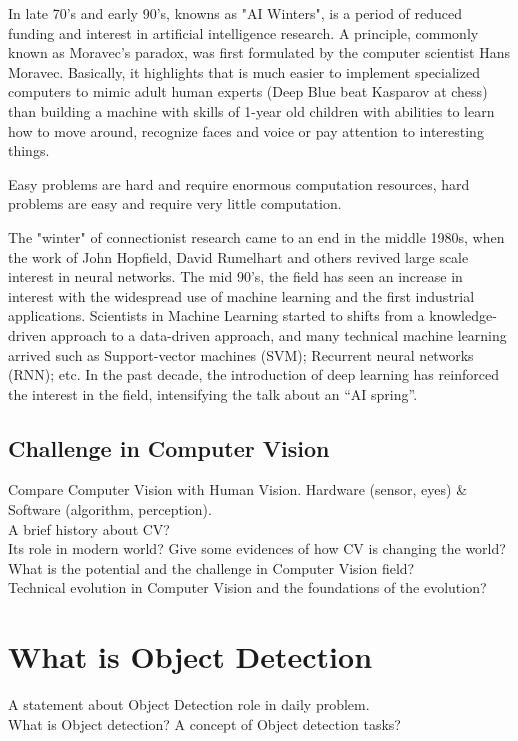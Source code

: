 \documentclass[12pt]{report}
\begin{document}
In late 70's and early 90's, knowns as "AI Winters", is a period of reduced funding and 
interest in artificial intelligence research\cite{aiwinter}. A principle, commonly known 
as Moravec’s paradox\cite{agrawal2010study}, was first formulated by the computer scientist 
Hans Moravec. Basically, it highlights that is much easier to implement specialized computers 
to mimic adult human experts (Deep Blue beat Kasparov at chess\cite{deepblue}) than building a 
machine with skills of 1-year old children with abilities to learn how to move around, 
recognize faces and voice or pay attention to interesting things. 

\begin{displayquote}
    Easy problems are hard and require enormous computation resources, 
    hard problems are easy and require very little computation. 
\end{displayquote}

The "winter" of connectionist research came to an end in the middle 1980s, 
when the work of John Hopfield, David Rumelhart and others revived large scale interest 
in neural networks. The mid 90's, the field has seen an increase in interest with the 
widespread use of machine learning and the first industrial applications. Scientists in Machine Learning started to 
shifts from a knowledge-driven approach to a data-driven approach, and many technical machine 
learning arrived such as Support-vector machines (SVM); Recurrent neural networks (RNN); etc.\cite{708428,medsker2001recurrent}
In the past decade, the introduction of deep learning has reinforced the interest in the field, 
intensifying the talk about an “AI spring”.

\subsection{Challenge in Computer Vision}
Compare Computer Vision with Human Vision. Hardware (sensor, eyes) \& 
Software (algorithm, perception). \\
A brief history about CV? \\
Its role in modern world? Give some evidences of how CV is changing the world? \\
What is the potential and the challenge in Computer Vision field? \\
Technical evolution in Computer Vision and the foundations of the evolution?

\section{What is Object Detection}
A statement about Object Detection role in daily problem.\\
What is Object detection? A concept of Object detection tasks?
\end{document}

